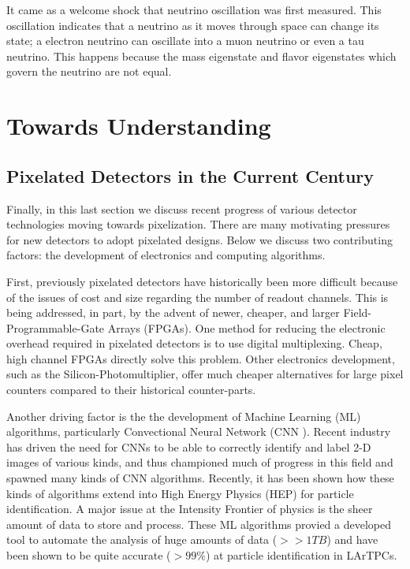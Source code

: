It came as a welcome shock that neutrino oscillation was first measured.
This oscillation indicates that a neutrino as it moves through space can change its state; a electron neutrino can oscillate into a muon neutrino or even a tau neutrino.
This happens because the mass eigenstate and flavor eigenstates which govern the neutrino are not equal.

\section{Towards Understanding}



\subsection{Pixelated Detectors in the Current Century}

Finally, in this last section we discuss recent progress of various detector technologies moving towards pixelization.
There are many motivating pressures for new detectors to adopt pixelated designs. 
Below we discuss two contributing factors: the development of electronics and computing algorithms.

First, previously pixelated detectors have historically been more difficult because of the issues of cost and size regarding the number of readout channels.
This is being addressed, in part, by the advent of newer, cheaper, and larger Field-Programmable-Gate Arrays (FPGAs).
One method for reducing the electronic overhead required in pixelated detectors is to use digital multiplexing.
Cheap, high channel FPGAs directly solve this problem. 
Other electronics development, such as the Silicon-Photomultiplier, offer much cheaper alternatives for large pixel counters compared to their historical counter-parts. 

\citep{Sadowski_2017}
Another driving factor is the the development of Machine Learning (ML) algorithms, particularly Convectional Neural Network (CNN \citep{Sadowski2017DeepLI}). 
Recent industry has driven the need for CNNs to be able to correctly identify and label 2-D images of various kinds, and thus championed much of progress in this field and spawned many kinds of CNN algorithms. 
Recently, it has been shown how these kinds of algorithms extend into High Energy Physics (HEP) for particle identification.
A major issue at the Intensity Frontier of physics is the sheer amount of data to store and process. 
These ML algorithms provied a developed tool to automate the analysis of huge amounts of data ($>> 1 TB$) and have been shown to be quite accurate ($>99\%$) at particle identification in LArTPCs.

